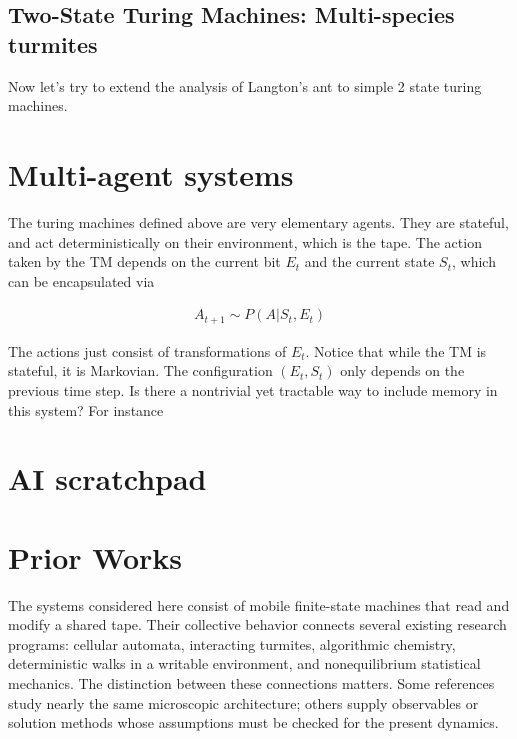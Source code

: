 \documentclass{article}
\begin{document}
\subsection{Two-State Turing Machines: Multi-species turmites}

Now let's try to extend the analysis of Langton's ant to simple 2 state turing machines. 



\section{Multi-agent systems}

The turing machines defined above are very elementary agents. They are stateful, and act deterministically on their environment, which is the tape. The action taken by the TM depends on the current bit $E_{t}$ and the current state $S_{t}$, which can be encapsulated via

\begin{align}
A_{t+1} \sim P(A| S_{t}, E_{t})
\end{align}

The actions just consist of transformations of $E_{t}$. Notice that while the TM is stateful, it is Markovian. The configuration $(E_{t}, S_{t})$ only depends on the previous time step. Is there a nontrivial yet tractable way to include memory in this system? For instance 




\newpage


\appendix
\section*{AI scratchpad}



\section{Prior Works}
\label{sec:prior-works}

The systems considered here consist of mobile finite-state machines that
read and modify a shared tape.  Their collective behavior connects several
existing research programs: cellular automata, interacting turmites,
algorithmic chemistry, deterministic walks in a writable environment, and
nonequilibrium statistical mechanics.  The distinction between these
connections matters.  Some references study nearly the same microscopic
architecture; others supply observables or solution methods whose
assumptions must be checked for the present dynamics.
\end{document}
